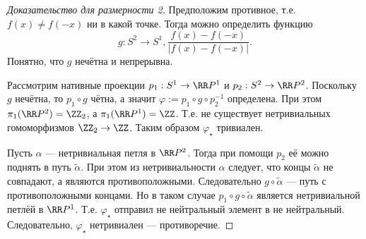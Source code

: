 \documentclass[12pt,a4paper]{article}
\begin{document}
    \begin{proof}[Доказательство для размерности 2]
        Предположим противное, т.е. $f(x) \neq f(-x)$ ни в какой точке. Тогда можно определить функцию
        \[g: S^2 \to S^1, \frac{f(x) - f(-x)}{|f(x) - f(-x)|}.\]
        Понятно, что $g$ нечётна и непрерывна.

        Рассмотрим нативные проекции $p_1: S^1 \to \RR P^1$ и $p_2: S^2 \to \RR P^2$. Поскольку $g$ нечётна, то $p_1 \circ g$ чётна, а значит $\varphi := p_1 \circ g \circ p_2^{-1}$ определена. При этом $\pi_1(\RR P^2) = \ZZ_2$, а $\pi_1(\RR P^1) = \ZZ$. Т.е. не существует нетривиальных гомоморфизмов $\ZZ_2 \to \ZZ$. Таким образом $\varphi_\star$ тривиален.

        Пусть $\alpha$ --- нетривиальная петля в $\RR P^2$. Тогда при помощи $p_2$ её можно поднять в путь $\widetilde{\alpha}$. При этом из нетривиальности $\alpha$ следует, что концы $\widetilde{\alpha}$ не совпадают, а являются противоположными. Следовательно $g \circ \widetilde{\alpha}$ --- путь с противоположными концами. Но в таком случае $p_1 \circ g \circ \widetilde{\alpha}$ является нетривиальной петлёй в $\RR P^1$. Т.е. $\varphi_\star$ отправил не нейтральный элемент в не нейтральный. Следовательно, $\varphi_\star$ нетривиален --- противоречие.
    \end{proof}

\end{document}
